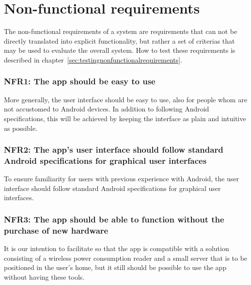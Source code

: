 \section{Non-functional requirements}
The non-functional requirements of a system are requirements that can not be directly translated into explicit functionality, but rather a set of criterias that may be used to evaluate the overall system. How to test these requirements is described in chapter~\ref{sec:testingnonfunctionalrequirements}.

\subsubsection{NFR1: The app should be easy to use}
More generally, the user interface should be easy to use, also for people whom are not accustomed to Android devices. In addition to following Android specifications, this will be achieved by keeping the interface as plain and intuitive as possible. 

\subsubsection{NFR2: The app's user interface should follow standard Android specifications for graphical user interfaces}
To ensure familiarity for users with previous experience with Android, the user interface should follow standard Android specifications for graphical user interfaces.

\subsubsection{NFR3: The app should be able to function without the purchase of new hardware}

It is our intention to facilitate so that the app is compatible with a solution consisting of a wireless power consumption reader and a small server that is to be positioned in the user's home, but it still should be possible to use the app without having these tools. 
 
